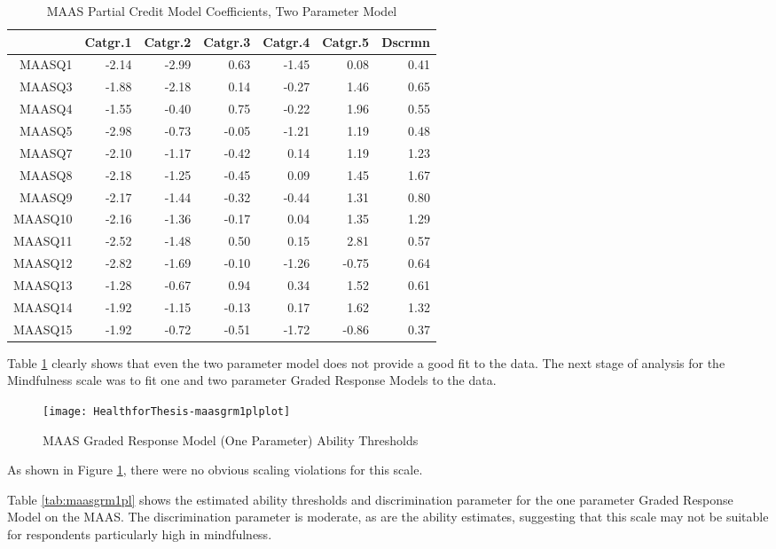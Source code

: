 \documentclass{article}
\begin{document}
\begin{table}[ht]
\centering
\begin{tabular}{rrrrrrr}
  \hline
 & Catgr.1 & Catgr.2 & Catgr.3 & Catgr.4 & Catgr.5 & Dscrmn \\ 
  \hline
MAASQ1 & -2.14 & -2.99 & 0.63 & -1.45 & 0.08 & 0.41 \\ 
  MAASQ3 & -1.88 & -2.18 & 0.14 & -0.27 & 1.46 & 0.65 \\ 
  MAASQ4 & -1.55 & -0.40 & 0.75 & -0.22 & 1.96 & 0.55 \\ 
  MAASQ5 & -2.98 & -0.73 & -0.05 & -1.21 & 1.19 & 0.48 \\ 
  MAASQ7 & -2.10 & -1.17 & -0.42 & 0.14 & 1.19 & 1.23 \\ 
  MAASQ8 & -2.18 & -1.25 & -0.45 & 0.09 & 1.45 & 1.67 \\ 
  MAASQ9 & -2.17 & -1.44 & -0.32 & -0.44 & 1.31 & 0.80 \\ 
  MAASQ10 & -2.16 & -1.36 & -0.17 & 0.04 & 1.35 & 1.29 \\ 
  MAASQ11 & -2.52 & -1.48 & 0.50 & 0.15 & 2.81 & 0.57 \\ 
  MAASQ12 & -2.82 & -1.69 & -0.10 & -1.26 & -0.75 & 0.64 \\ 
  MAASQ13 & -1.28 & -0.67 & 0.94 & 0.34 & 1.52 & 0.61 \\ 
  MAASQ14 & -1.92 & -1.15 & -0.13 & 0.17 & 1.62 & 1.32 \\ 
  MAASQ15 & -1.92 & -0.72 & -0.51 & -1.72 & -0.86 & 0.37 \\ 
   \hline
\end{tabular}
\caption{MAAS Partial Credit Model Coefficients, Two Parameter Model} 
\label{tab:maaspcm2pl}
\end{table}
Table \ref{tab:maaspcm2pl} clearly shows that even the two parameter model does not provide a good fit to the data. The next stage of analysis for the Mindfulness scale was to fit one and two parameter Graded Response Models to the data. 


\begin{figure}
\texttt{[image: HealthforThesis-maasgrm1plplot]}
  \caption{MAAS Graded Response Model (One Parameter) Ability Thresholds}
  \label{fig:maasgrm1plplot}
\end{figure}

As shown in Figure \ref{fig:maasgrm1plplot}, there were no obvious scaling violations for this scale. 


Table \ref{tab:maasgrm1pl} shows the estimated ability thresholds and discrimination parameter for the one parameter Graded Response Model on the MAAS. The discrimination parameter is moderate, as are the ability estimates, suggesting that this scale may not be suitable for respondents particularly high in mindfulness. 
\end{document}
